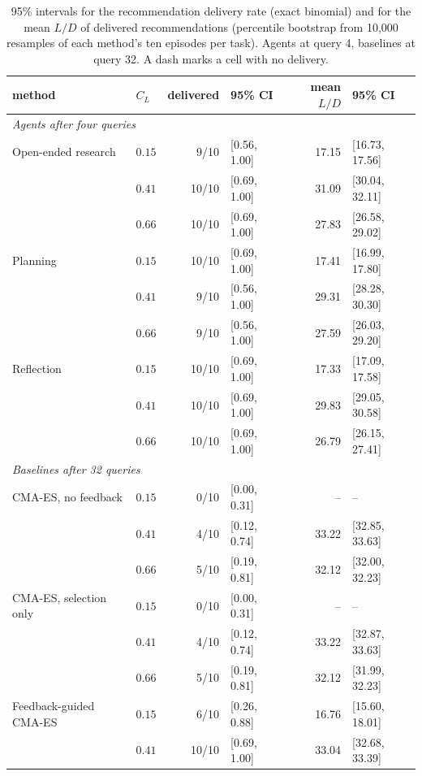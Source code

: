\documentclass{article} %
\begin{document}
\begin{table}[h]
\caption{95\% intervals for the recommendation delivery rate (exact binomial)
and for the mean $L/D$ of delivered recommendations (percentile bootstrap from
10{,}000 resamples of each method's ten episodes per task). Agents at query 4,
baselines at query 32. A dash marks a cell with no delivery.}
\label{tab:marginal}
\centering
\scriptsize
\setlength{\tabcolsep}{4pt}
\begin{tabular*}{\textwidth}{@{\extracolsep{\fill}}llrlrl}
\toprule
method & $C_L$ & delivered & 95\% CI & mean $L/D$ & 95\% CI \\
\midrule
\multicolumn{6}{l}{\emph{Agents after four queries}} \\
Open-ended research & $0.15$ & 9/10 & [0.56, 1.00] & 17.15 & [16.73, 17.56] \\
 & $0.41$ & 10/10 & [0.69, 1.00] & 31.09 & [30.04, 32.11] \\
 & $0.66$ & 10/10 & [0.69, 1.00] & 27.83 & [26.58, 29.02] \\
Planning & $0.15$ & 10/10 & [0.69, 1.00] & 17.41 & [16.99, 17.80] \\
 & $0.41$ & 9/10 & [0.56, 1.00] & 29.31 & [28.28, 30.30] \\
 & $0.66$ & 9/10 & [0.56, 1.00] & 27.59 & [26.03, 29.20] \\
Reflection & $0.15$ & 10/10 & [0.69, 1.00] & 17.33 & [17.09, 17.58] \\
 & $0.41$ & 10/10 & [0.69, 1.00] & 29.83 & [29.05, 30.58] \\
 & $0.66$ & 10/10 & [0.69, 1.00] & 26.79 & [26.15, 27.41] \\
\midrule
\multicolumn{6}{l}{\emph{Baselines after 32 queries}} \\
CMA-ES, no feedback & $0.15$ & 0/10 & [0.00, 0.31] & -- & -- \\
 & $0.41$ & 4/10 & [0.12, 0.74] & 33.22 & [32.85, 33.63] \\
 & $0.66$ & 5/10 & [0.19, 0.81] & 32.12 & [32.00, 32.23] \\
CMA-ES, selection only & $0.15$ & 0/10 & [0.00, 0.31] & -- & -- \\
 & $0.41$ & 4/10 & [0.12, 0.74] & 33.22 & [32.87, 33.63] \\
 & $0.66$ & 5/10 & [0.19, 0.81] & 32.12 & [31.99, 32.23] \\
Feedback-guided CMA-ES & $0.15$ & 6/10 & [0.26, 0.88] & 16.76 & [15.60, 18.01] \\
 & $0.41$ & 10/10 & [0.69, 1.00] & 33.04 & [32.68, 33.39] \\

\end{tabular*}
\end{table}
\end{document}
